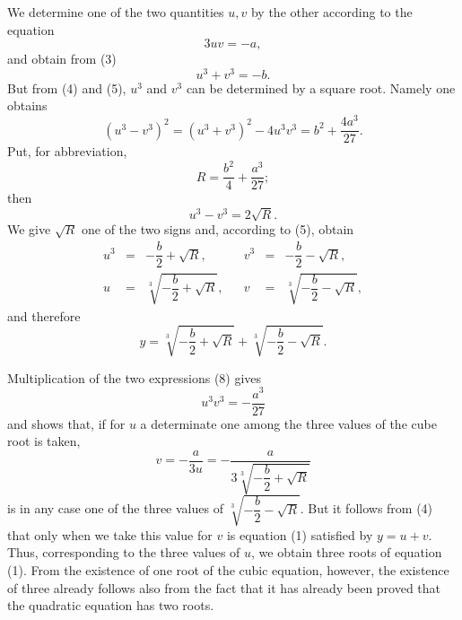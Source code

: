 \documentclass[11pt]{article}
\begin{document}
We determine one of the two quantities $u,v$ by the other according to the equation
\begin{equation}
3uv=-a,
\tag{4}
\end{equation}
and obtain from (3)
\begin{equation}
u^3+v^3=-b.
\tag{5}
\end{equation}
But from (4) and (5), $u^3$ and $v^3$ can be determined by a square root. Namely one obtains
\begin{equation}
(u^3-v^3)^2=(u^3+v^3)^2-4u^3v^3
=b^2+\frac{4a^3}{27}.
\tag{6}
\end{equation}
Put, for abbreviation,
\begin{equation}
R=\frac{b^2}{4}+\frac{a^3}{27};
\tag{7}
\end{equation}
then
\[
 u^3-v^3=2\sqrt R.
\]
We give $\sqrt R$ one of the two signs and, according to (5), obtain
\begin{equation}
\begin{array}{rclcrcl}
u^3&=&-\dfrac b2+\sqrt R,&& v^3&=&-\dfrac b2-\sqrt R,\\[0.75em]
u&=&\sqrt[3]{-\dfrac b2+\sqrt R},&& v&=&\sqrt[3]{-\dfrac b2-\sqrt R},
\end{array}
\tag{8}
\end{equation}
and therefore
\begin{equation}
y=\sqrt[3]{-\frac b2+\sqrt R}+\sqrt[3]{-\frac b2-\sqrt R}.
\tag{9}
\end{equation}

Multiplication of the two expressions (8) gives
\[
 u^3v^3=-\frac{a^3}{27}
\]
and shows that, if for $u$ a determinate one among the three values of the cube root is taken,
\begin{equation}
v=-\frac{a}{3u}=-\frac{a}{3\sqrt[3]{-\dfrac b2+\sqrt R}}
\tag{10}
\end{equation}
is in any case one of the three values of $\sqrt[3]{-\dfrac b2-\sqrt R}$. But it follows from (4) that only when we take this value for $v$ is equation (1) satisfied by $y=u+v$. Thus, corresponding to the three values of $u$, we obtain three roots of equation (1). From the existence of one root of the cubic equation, however, the existence of three already follows also from the fact that it has already been proved that the quadratic equation has two roots.
\end{document}
